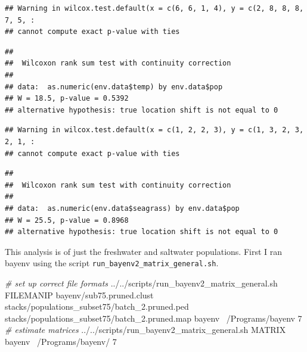 \documentclass[]{article}
\newenvironment{Shaded}{\begin{snugshade}}{\end{snugshade}}
\newcommand{\KeywordTok}[1]{\textcolor[rgb]{0.13,0.29,0.53}{\textbf{#1}}}
\newcommand{\CommentTok}[1]{\textcolor[rgb]{0.56,0.35,0.01}{\textit{#1}}}
\newcommand{\OperatorTok}[1]{\textcolor[rgb]{0.81,0.36,0.00}{\textbf{#1}}}
\newcommand{\ExtensionTok}[1]{#1}
\newcommand{\NormalTok}[1]{#1}
\begin{document}
\begin{verbatim}
## Warning in wilcox.test.default(x = c(6, 6, 1, 4), y = c(2, 8, 8, 8, 7, 5, :
## cannot compute exact p-value with ties
\end{verbatim}

\begin{verbatim}
## 
##  Wilcoxon rank sum test with continuity correction
## 
## data:  as.numeric(env.data$temp) by env.data$pop
## W = 18.5, p-value = 0.5392
## alternative hypothesis: true location shift is not equal to 0
\end{verbatim}

\begin{Shaded}
\end{Shaded}

\begin{verbatim}
## Warning in wilcox.test.default(x = c(1, 2, 2, 3), y = c(1, 3, 2, 3, 2, 1, :
## cannot compute exact p-value with ties
\end{verbatim}

\begin{verbatim}
## 
##  Wilcoxon rank sum test with continuity correction
## 
## data:  as.numeric(env.data$seagrass) by env.data$pop
## W = 25.5, p-value = 0.8968
## alternative hypothesis: true location shift is not equal to 0
\end{verbatim}

This analysis is of just the freshwater and saltwater populations. First
I ran bayenv using the script \texttt{run\_bayenv2\_matrix\_general.sh}.

\begin{Shaded}
\begin{Highlighting}[]
\CommentTok{# set up correct file formats}
\ExtensionTok{../../scripts/run_bayenv2_matrix_general.sh}\NormalTok{ FILEMANIP bayenv/sub75.pruned.clust stacks/populations_subset75/batch_2.pruned.ped stacks/populations_subset75/batch_2.pruned.map bayenv ~/Programs/bayenv 7}
\CommentTok{# estimate matrices}
\ExtensionTok{../../scripts/run_bayenv2_matrix_general.sh}\NormalTok{ MATRIX bayenv ~/Programs/bayenv/ 7}
\end{Highlighting}
\end{Shaded}
\end{document}
